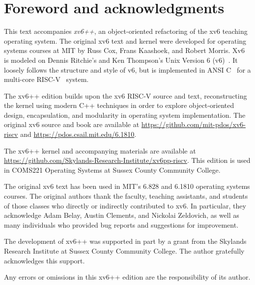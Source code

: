 \chapter*{Foreword and acknowledgments}

This text accompanies \textit{xv6++}, an object-oriented refactoring of
the xv6 teaching operating system.  The original xv6 text and kernel
were developed for operating systems courses at MIT by Russ Cox,
Frans Kaashoek, and Robert Morris.  Xv6 is modeled on Dennis
Ritchie's and Ken Thompson's Unix Version 6 (v6)~\cite{unix}.  It
loosely follows the structure and style of v6, but is implemented in
ANSI C~\cite{kernighan} for a multi-core RISC-V~\cite{riscv} system.

The xv6++ edition builds upon the xv6 RISC-V source and text,
reconstructing the kernel using modern C++ techniques in order to
explore object-oriented design, encapsulation, and modularity in
operating system implementation.  The original xv6 source and book are
available at \url{https://github.com/mit-pdos/xv6-riscv} and
\url{https://pdos.csail.mit.edu/6.1810}.

The xv6++ kernel and accompanying materials are available at
\url{https://github.com/Skylands-Research-Institute/xv6pp-riscv}.
This edition is used in COMS221 Operating Systems at Sussex County
Community College.

The original xv6 text has been used in MIT's 6.828 and 6.1810 operating
systems courses.  The original authors thank the faculty, teaching
assistants, and students of those classes who directly or indirectly
contributed to xv6.  In particular, they acknowledge Adam Belay,
Austin Clements, and Nickolai Zeldovich, as well as many individuals
who provided bug reports and suggestions for improvement.

The development of xv6++ was supported in part by a grant from the
Skylands Research Institute at Sussex County Community College.
The author gratefully acknowledges this support.

Any errors or omissions in this xv6++ edition are the responsibility
of its author.
